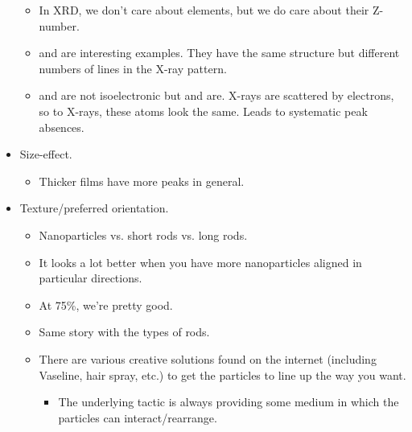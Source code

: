 \documentclass[../notes.tex]{subfiles}
\begin{document}
\begin{itemize}
\begin{itemize}
        \item In XRD, we don't care about elements, but we do care about their Z-number.
        \item {} and  are interesting examples. They have the same structure but different numbers of lines in the X-ray pattern.
        \item {} and  are not isoelectronic but  and  are. X-rays are scattered by electrons, so to X-rays, these atoms look the same. Leads to systematic peak absences.
    \end{itemize}
    \item Size-effect.
    \begin{itemize}
        \item Thicker films have more peaks in general.
    \end{itemize}
    \item Texture/preferred orientation.
    \begin{itemize}
        \item Nanoparticles vs. short rods vs. long rods.
        \item It looks a lot better when you have more nanoparticles aligned in particular directions.
        \item At 75\%, we're pretty good.
        \item Same story with the types of rods.
        \item There are various creative solutions found on the internet (including Vaseline, hair spray, etc.) to get the particles to line up the way you want.
        \begin{itemize}
            \item The underlying tactic is always providing some medium in which the particles can interact/rearrange.
        \end{itemize}
    \end{itemize}
\end{itemize}
\end{document}
